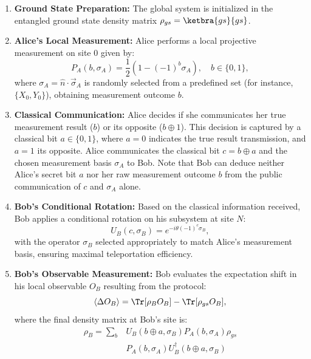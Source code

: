 \begin{enumerate}
    \item \textbf{Ground State Preparation:} 
    The global system is initialized in the entangled ground state density matrix $\rho_{gs}=\ketbra{gs}{gs}$.

    \item \textbf{Alice’s Local Measurement:}
    Alice performs a local projective measurement on site $0$ given by:
    \begin{equation}
    P_A(b,\sigma_A)=\frac{1}{2}\left( 1-(-1)^b\sigma_A \right),\quad b\in\{0,1\},
    \end{equation}
    where $\sigma_A=\hat{n}\cdot\vec{\sigma}_A$ is randomly selected from a predefined set (for instance, $\{X_0,Y_0\}$), obtaining measurement outcome $b$.

    \item \textbf{Classical Communication:}
    Alice decides if she communicates her true measurement result ($b$) or its opposite ($b\oplus 1$). This decision is captured by a classical bit $a\in\{0,1\}$, where $a=0$ indicates the true result transmission, and $a=1$ its opposite. Alice communicates the classical bit $c=b\oplus a$ and the chosen measurement basis $\sigma_A$ to Bob. Note that Bob can deduce neither Alice's secret bit $a$ nor her raw measurement outcome $b$ from the public communication of $c$ and $\sigma_A$ alone.

    \item \textbf{Bob’s Conditional Rotation:}
    Based on the classical information received, Bob applies a conditional rotation on his subsystem at site $N$:
    \begin{equation}
    U_B(c,\sigma_B)=e^{-i\theta(-1)^c\sigma_B},
    \end{equation}
    with the operator $\sigma_B$ selected appropriately to match Alice's measurement basis, ensuring maximal teleportation efficiency.

    \item \textbf{Bob’s Observable Measurement:}
    Bob evaluates the expectation shift in his local observable $O_B$ resulting from the protocol:
    \begin{equation}
    \langle\Delta O_B\rangle=\Tr[\rho_B O_B]-\Tr[\rho_{gs} O_B],
    \end{equation}
    where the final density matrix at Bob's site is:
    \begin{align}
    \rho_B=\sum_{b}&{}U_B(b\oplus a,\sigma_B)P_A(b,\sigma_A)\rho_{gs} \nonumber\\
    &P_A(b,\sigma_A)U_B^\dagger(b\oplus a,\sigma_B)
    \end{align}
\end{enumerate}

